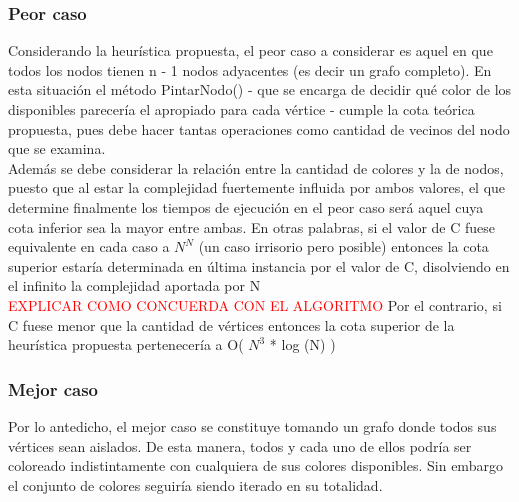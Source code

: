 \subsubsection{Peor caso}
Considerando la heurística propuesta, el peor caso a considerar es aquel en que todos los nodos tienen n - 1 nodos adyacentes (es decir un grafo completo). En esta situación el método PintarNodo() - que  se encarga de decidir qué color de los disponibles parecería el apropiado para cada vértice - cumple la cota teórica propuesta, pues debe hacer tantas operaciones como cantidad de vecinos del nodo que  se examina.\\

Además se debe considerar la relación entre la cantidad de colores y la de nodos, puesto que al estar la complejidad fuertemente influida por ambos valores, el que determine finalmente los tiempos de ejecución en el peor caso será aquel cuya cota inferior sea la mayor entre ambas. En otras palabras, si el valor de C fuese equivalente en cada caso a $N^{N}$  (un caso irrisorio pero posible) entonces la cota superior estaría determinada en última instancia por el valor de C, disolviendo en el infinito la complejidad aportada por N\\\textcolor{red}{EXPLICAR COMO CONCUERDA CON EL ALGORITMO}
Por el contrario, si C fuese menor que la cantidad de vértices entonces la cota superior de la heurística propuesta pertenecería a O( $N^{3}$ * log (N) )


\subsubsection{Mejor caso}
Por lo antedicho, el mejor caso se constituye tomando un grafo donde todos sus vértices sean aislados. De esta manera, todos y cada uno de ellos podría ser coloreado indistintamente con cualquiera de sus colores disponibles. Sin embargo el conjunto de colores seguiría siendo iterado en su totalidad.



\newpage
